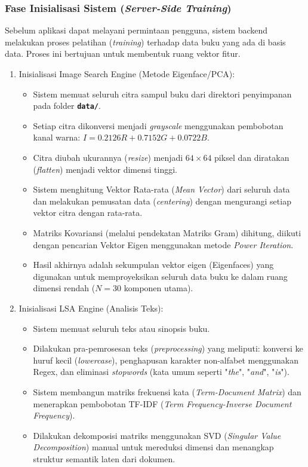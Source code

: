 \documentclass[12pt,a4paper]{article}
\begin{document}
\subsubsection{Fase Inisialisasi Sistem (\textit{Server-Side Training})}
Sebelum aplikasi dapat melayani permintaan pengguna, sistem backend melakukan proses pelatihan (\textit{training}) terhadap data buku yang ada di basis data. Proses ini bertujuan untuk membentuk ruang vektor fitur.
\begin{enumerate}
    \item Inisialisasi Image Search Engine (Metode Eigenface/PCA):
        \begin{itemize}
            \item Sistem memuat seluruh citra sampul buku dari direktori penyimpanan pada folder        \texttt{\textbf{data/}}.
            \item Setiap citra dikonversi menjadi \textit{grayscale} menggunakan pembobotan kanal warna:    $I =   0.2126R + 0.7152G + 0.0722B$.
            \item Citra diubah ukurannya (\textit{resize}) menjadi $64 \times 64$ piksel dan diratakan      (\textit{flatten}) menjadi vektor dimensi tinggi.
            \item Sistem menghitung Vektor Rata-rata (\textit{Mean Vector}) dari seluruh data dan   melakukan     pemusatan data (\textit{centering}) dengan mengurangi setiap vektor citra dengan    rata-rata.
            \item Matriks Kovariansi (melalui pendekatan Matriks Gram) dihitung, diikuti dengan pencarian    Vektor Eigen menggunakan metode \textit{Power Iteration}.
            \item Hasil akhirnya adalah sekumpulan vektor eigen (Eigenfaces) yang digunakan untuk   memproyeksikan seluruh data buku ke dalam ruang dimensi rendah ($N=30$ komponen utama).
        \end{itemize}
    \item Inisialisasi LSA Engine (Analisis Teks):
        \begin{itemize}
            \item Sistem memuat seluruh teks atau sinopsis buku.
            \item Dilakukan pra-pemrosesan teks (\textit{preprocessing}) yang meliputi: konversi ke huruf kecil (\textit{lowercase}), penghapusan karakter non-alfabet menggunakan Regex, dan eliminasi \textit{stopwords} (kata umum seperti "\textit{the}", "\textit{and}", "\textit{is}").
            \item Sistem membangun matriks frekuensi kata (\textit{Term-Document Matrix}) dan menerapkan pembobotan TF-IDF (\textit{Term Frequency-Inverse Document Frequency}).
            \item Dilakukan dekomposisi matriks menggunakan SVD (\textit{Singular Value Decomposition}) manual untuk mereduksi dimensi dan menangkap struktur semantik laten dari dokumen.
        \end{itemize}
\end{enumerate}
\end{document}
